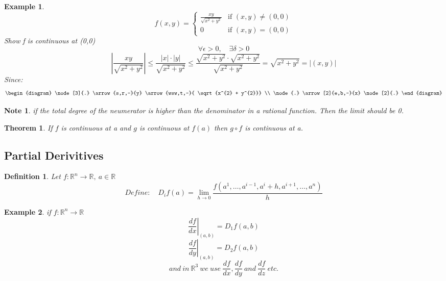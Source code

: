 \documentclass[12pt]{article}
\def\RR{\mathbb{R}}
\newtheorem{theorem}{Theorem}[section]
\newtheorem{definition}{Definition}[section]
\newtheorem{example}{Example}[section]
\newtheorem*{note}{Note}
\begin{document}
\begin{example}

\[
 f(x,y) =
  \begin{cases}
   \frac{xy}{\sqrt{x^{2} + y^{2}}} & \text{if } (x,y) \neq (0,0) \\
   0       & \text{if } (x,y) = (0,0)
  \end{cases}
\]
Show f is continuous at (0,0)
\[\forall \epsilon > 0, \quad \exists \delta>0\]
\[\left| \frac{xy}{\sqrt{x^{2} + y^{2}}}\right| \leq \frac{|x| \cdot |y|}{\sqrt{x^{2} + y^{2}}} \leq \frac{\sqrt{x^{2} + y^{2}} \cdot \sqrt{x^{2} + y^{2}}}{\sqrt{x^{2} + y^{2}}}= \sqrt{x^{2} + y^{2}} = |(x,y)|\]
Since: \[\begin{diagram}
\node[3]{.} \arrow{s,r,-}{y} \arrow{wsw,t,-}{ \sqrt{x^{2} + y^{2}}} \\
\node{.} \arrow[2]{e,b,-}{x} \node[2]{.}
\end{diagram}\]
\end{example}
\begin{note}
if the total degree of the neumerator is higher than the denominator in a rational function. Then the limit should be 0.
\end{note}

\begin{theorem}\label{T:composition}
If $f$ is continuous at a and $g$ is continuous at $f(a)$ then $g \circ f$ is continuous at a.
\end{theorem}

\subsection{Partial Derivitives}

\begin{definition}
Let $f:\RR^{n} \rightarrow \RR, \: a\in \RR$
\[Define: \quad D_{i}f(a) = \lim_{h \to 0}\frac{f(a^{1}, \dots , a^{i-1}, a^{i}+h, a^{i+1}, \dots , a^{n})}{h}\]
\end{definition}

\begin{example}
if $f:\RR^{n} \rightarrow \RR$
\[\left.\frac{df}{dx}\right| _{(a,b)} = D_{1}f(a,b)\]
\[\left.\frac{df}{dy}\right| _{(a,b)} = D_{2}f(a,b)\]
\[and \: in \: \RR^{3} \: we\: use \: \frac{df}{dx}, \frac{df}{dy} \: and \: \frac{df}{dz} \: etc.\]
\end{example}
\end{document}
